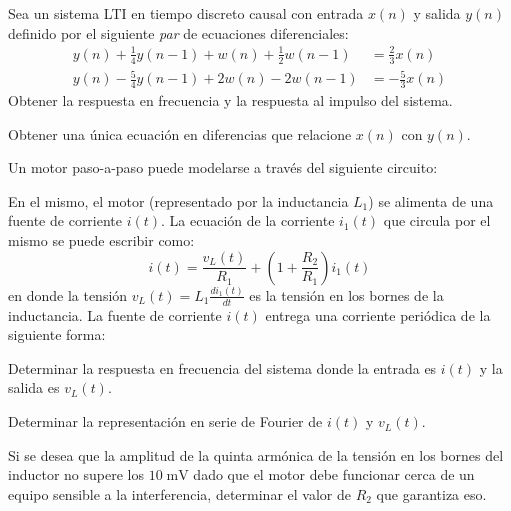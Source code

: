 \begin{ejercicio}
    Sea un sistema LTI en tiempo discreto causal con entrada $x(n)$ y salida $y(n)$ definido por el siguiente \emph{par} de ecuaciones diferenciales:
    \begin{align*}
        y(n) + \frac{1}{4} y(n-1) + w(n) + \frac{1}{2} w(n-1) &= \frac{2}{3} x(n) \\
        y(n) - \frac{5}{4} y(n-1) + 2w(n) - 2 w(n-1) &= -\frac{5}{3} x(n)
    \end{align*}
    \inciso Obtener la respuesta en frecuencia y la respuesta al impulso del sistema.
    
    \inciso Obtener una única ecuación en diferencias que relacione $x(n)$ con $y(n)$.
\end{ejercicio}

\begin{ejercicio}
    Un motor paso-a-paso puede modelarse a través del siguiente circuito:
    \begin{center}
        \parbox{0.5\textwidth}{
            
        }
    \end{center}
    
    En el mismo, el motor (representado por la inductancia $L_1$) se alimenta de una fuente de corriente $i(t)$. La ecuación de la corriente $i_1(t)$ que circula por el mismo se puede escribir como:
    \begin{equation*}
        i(t) = \frac{v_L(t)}{R_1} + \left(1 + \frac{R_2}{R_1}\right) i_1(t)
    \end{equation*}
    en donde la tensión $v_L(t) = L_1 \frac{d i_1(t)}{dt}$ es la tensión en los bornes de la inductancia. La fuente de corriente $i(t)$ entrega una corriente periódica de la siguiente forma:
    \begin{center}
        \parbox{0.5\textwidth}{
            
        }
    \end{center}
    \inciso Determinar la respuesta en frecuencia del sistema donde la entrada es $i(t)$ y la salida es $v_L(t)$.

    \inciso Determinar la representación en serie de Fourier de $i(t)$ y $v_L(t)$.

    \inciso Si se desea que la amplitud de la quinta armónica de la tensión en los bornes del inductor no supere los $10\;\mathrm{mV}$ dado que el motor debe funcionar cerca de un equipo sensible a la interferencia, determinar el valor de $R_2$ que garantiza eso. 
\end{ejercicio}

